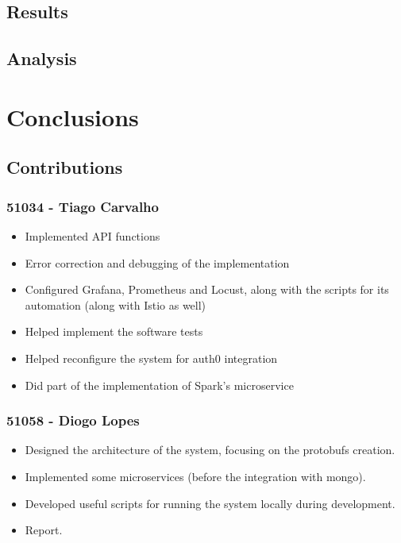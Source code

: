 \documentclass[oneside]{article}
\begin{document}
  \subsection{Results}
  \label{sec:results}

  \subsection{Analysis}
  \label{sec:analysis}

\section{Conclusions}
\label{sec:conclusion}

  \subsection{Contributions}
  \label{sec:contributions}

    \subsubsection{51034 - Tiago Carvalho}
    	\begin{itemize}
    		\item Implemented API functions
    		\item Error correction and debugging of the implementation
    		\item Configured Grafana, Prometheus and Locust, along with the scripts for its automation (along with Istio as well)
    		\item Helped implement the software tests
    		\item Helped reconfigure the system for auth0 integration
    		\item Did part of the implementation of Spark's microservice
    	\end{itemize}
    \subsubsection{51058 - Diogo Lopes}
      \begin{itemize}
        \item Designed the architecture of the system, focusing on the protobufs creation.
        \item Implemented some microservices (before the integration with mongo).
        \item Developed useful scripts for running the system locally during development.
        \item Report.
      \end{itemize}
\end{document}
